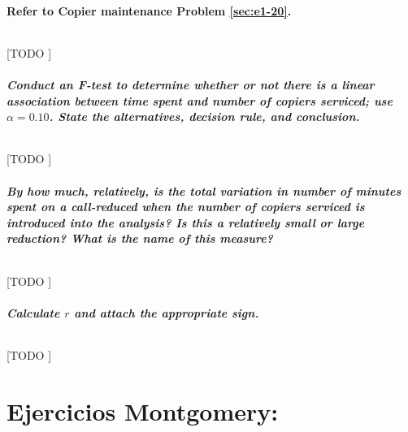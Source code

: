 \documentclass{article}
\begin{document}
    \setcounter{subsection}{23}
    \subsection{Refer to \textbf{Copier maintenance} Problem \ref{sec:e1-20}.}


      \paragraph{}
      [TODO ]

      \setcounter{subsection}{1}
      \subsubsection{Conduct an \emph{F-test} to determine whether or not there is a linear association between time spent and number of copiers serviced; use $\alpha = 0.10$. State the alternatives, decision rule, and conclusion.}

        \paragraph{}
        [TODO ]

      \subsubsection{By how much, relatively, is the total variation in number of minutes spent on a call-reduced when the number of copiers serviced is introduced into the analysis? Is this a relatively small or large reduction? What is the name of this measure?}

        \paragraph{}
        [TODO ]

      \subsubsection{Calculate $r$ and attach the appropriate sign.}

        \paragraph{}
        [TODO ]


  \part{Ejercicios Montgomery:}
\end{document}
